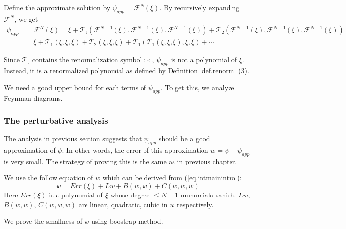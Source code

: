 
Define the approximate solution by $\psi_{app}=\mathcal{F}^{N}(\xi)$. By recursively expanding  $\mathcal{F}^{N}$, we get  
\begin{equation*}
\begin{split}
    \psi_{app}=&\mathcal{F}^{N}(\xi)=\xi+\mathcal{T}_1(\mathcal{F}^{N-1}(\xi),\mathcal{F}^{N-1}(\xi),\mathcal{F}^{N-1}(\xi)) + \mathcal{T}_2(\mathcal{F}^{N-1}(\xi),\mathcal{F}^{N-1}(\xi),\mathcal{F}^{N-1}(\xi))
    \\
    =&\xi+\mathcal{T}_1(\xi,\xi,\xi)+ \mathcal{T}_2(\xi,\xi,\xi) +\mathcal{T}_1(\mathcal{T}_1(\xi,\xi,\xi),\xi,\xi)
    +\cdots
\end{split}    
\end{equation*}

Since $\mathcal{T}_2$ contains the renormalization symbol $:\cdot:$, $\psi_{app}$ is not a polynomial of $\xi$. Instead, it is a renormalized polynomial as defined by Definition \ref{def.renorm} (3).

We need a good upper bound for each terms of $\psi_{app}$. To get this, we analyze Feynman diagrams. 

\subsubsection{The perturbative analysis}\label{sec.pert intro} The analysis in previous section suggests that $\psi_{app}$ should be a good approximation of $\psi$. In other words, the error of this approximation $w=\psi-\psi_{app}$ is very small. The strategy of proving this is the same as in previous chapter.

We use the follow equation of $w$ which can be derived from (\ref{eq.intmainintro}):
\begin{equation}\label{eq.eqwintro}
    w= Err(\xi)+Lw+B(w,w)+C(w,w,w)
\end{equation}
Here $Err(\xi)$ is a polynomial of $\xi$ whose degree $\le N+1$ monomials vanish. $Lw$, $B(w,w)$, $C(w,w,w)$ are linear, quadratic, cubic in $w$ respectively.

We prove the smallness of $w$ using boostrap method.

